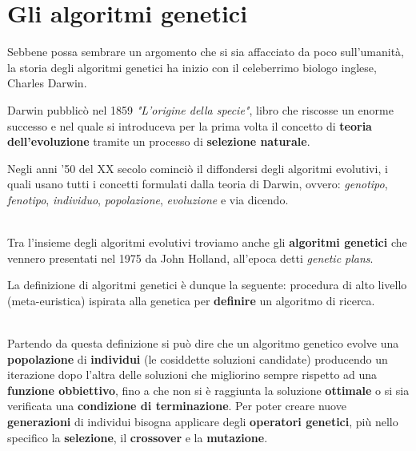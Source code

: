 \documentclass[a4paper, 11pt, oneside]{report}
\begin{document}
            \section{Gli algoritmi genetici}
            Sebbene possa sembrare un argomento che si sia affacciato da poco sull'umanità, la storia degli algoritmi genetici
            ha inizio con il celeberrimo biologo inglese, Charles Darwin.
            \par \noindent Darwin pubblicò nel 1859 \textit{"L'origine della specie"}, libro che riscosse un enorme
            successo e nel quale si introduceva per la prima volta il concetto di \textbf{teoria dell'evoluzione} tramite
            un processo di \textbf{selezione naturale}.
            \par \noindent Negli anni '50 del XX secolo cominciò il diffondersi degli algoritmi evolutivi,
            i quali usano tutti i concetti formulati dalla teoria di Darwin, ovvero:
            \textit{genotipo}, \textit{fenotipo}, \textit{individuo}, \textit{popolazione}, \textit{evoluzione} e via dicendo.
            \par \noindent
            \\ \noindent Tra l'insieme degli algoritmi evolutivi troviamo anche gli \textbf{algoritmi genetici} che vennero
            presentati nel 1975 da John Holland, all'epoca detti \textit{genetic plans}.
            \par \noindent La definizione di algoritmi genetici è dunque la seguente:
            procedura di alto livello (meta-euristica) ispirata alla genetica per \textbf{definire}
            un algoritmo di ricerca.
            \par \noindent
            \\ \noindent Partendo da questa definizione si può dire che un algoritmo genetico evolve una \textbf{popolazione}
            di \textbf{individui} (le cosiddette soluzioni candidate) producendo un iterazione dopo l'altra delle
            soluzioni che migliorino sempre rispetto ad una \textbf{funzione obbiettivo}, fino a che non si è raggiunta
            la soluzione \textbf{ottimale} o si sia verificata una \textbf{condizione di terminazione}.
            Per poter creare nuove \textbf{generazioni} di individui bisogna applicare degli \textbf{operatori genetici},
            più nello specifico la \textbf{selezione}, il \textbf{crossover} e la \textbf{mutazione}.
            \par \noindent

            \newpage
\end{document}
